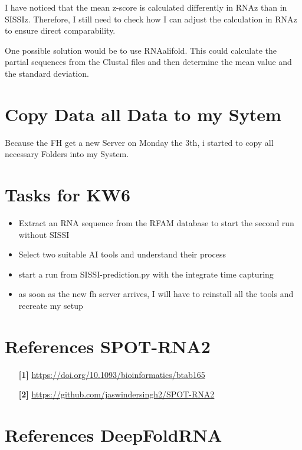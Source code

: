 \documentclass{article}
\begin{document}
\begin{large}
\begin{large}
I have noticed that the mean z-score is calculated differently in RNAz than in SISSIz. Therefore, I still need to check how I can adjust the calculation in RNAz to ensure direct comparability.

One possible solution would be to use RNAalifold. This could calculate the partial sequences from the Clustal files and then determine the mean value and the standard deviation.

\section{Copy Data all Data to my Sytem}

Because the FH get a new Server on Monday the 3th, i started to copy all necessary Folders into my System.

\section{Tasks for KW6}

\begin{itemize}
    \item Extract an RNA sequence from the RFAM database to start the second run without SISSI
    \item Select two suitable AI tools and understand their process 
    \item start a run from SISSI-prediction.py with the integrate time capturing
    \item as soon as the new fh server arrives, I will have to reinstall all the tools and recreate my setup
\end{itemize}


\section{References SPOT-RNA2}

\begin{itemize}
    \item[\textbf{[1]}] \url{https://doi.org/10.1093/bioinformatics/btab165} \par
    \item[\textbf{[2]}] \url{https://github.com/jaswindersingh2/SPOT-RNA2}
\end{itemize}


\section{References DeepFoldRNA}


\end{large}
\end{large}
\end{document}
